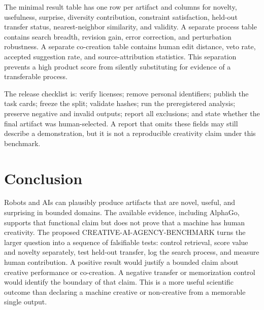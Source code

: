 \documentclass[conference]{IEEEtran}
\begin{document}
The minimal result table has one row per artifact and columns for novelty, usefulness,
surprise, diversity contribution, constraint satisfaction, held-out transfer status,
nearest-neighbor similarity, and validity. A separate process table contains search
breadth, revision gain, error correction, and perturbation robustness. A separate
co-creation table contains human edit distance, veto rate, accepted suggestion rate,
and source-attribution statistics. This separation prevents a high product score from
silently substituting for evidence of a transferable process.

The release checklist is: verify licenses; remove personal identifiers; publish the
task cards; freeze the split; validate hashes; run the preregistered analysis; preserve
negative and invalid outputs; report all exclusions; and state whether the final artifact
was human-selected. A report that omits these fields may still describe a demonstration,
but it is not a reproducible creativity claim under this benchmark.

\section{Conclusion}
\label{sec:conclusion}

Robots and AIs can plausibly produce artifacts that are novel, useful, and surprising in
bounded domains. The available evidence, including AlphaGo, supports that functional
claim but does not prove that a machine has human creativity. The proposed
CREATIVE-AI-AGENCY-BENCHMARK turns the larger question into a sequence of falsifiable
tests: control retrieval, score value and novelty separately, test held-out transfer,
log the search process, and measure human contribution. A positive result would justify
a bounded claim about creative performance or co-creation. A negative transfer or
memorization control would identify the boundary of that claim. This is a more useful
scientific outcome than declaring a machine creative or non-creative from a memorable
single output.
\end{document}

